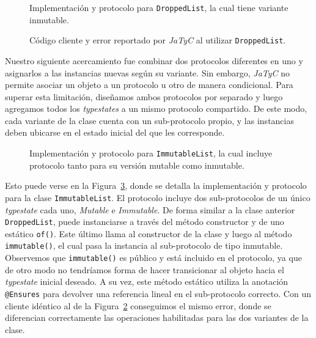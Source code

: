 \begin{figure}[htbp]
    \centering
    
    \vspace{0.3cm}
    
    \caption{Implementación y protocolo para \texttt{DroppedList}, la cual tiene variante inmutable.}
    \label{exp:dropped-list}
\end{figure}

\begin{figure}[htbp]
    \centering
    
    \vspace{0.3cm}
    
    \caption{Código cliente y error reportado por \textit{JaTyC} al utilizar \texttt{DroppedList}.}
    \label{exp:dropped-list:client}
\end{figure}

Nuestro siguiente acercamiento fue combinar dos protocolos diferentes en uno y asignarlos a las instancias nuevas según su variante. Sin embargo, \textit{JaTyC} no permite asociar un objeto a un protocolo u otro de manera condicional. Para superar esta limitación, diseñamos ambos protocolos por separado y luego agregamos todos los \textit{typestates} a un mismo protocolo compartido. De este modo, cada variante de la clase cuenta con un sub-protocolo propio, y las instancias deben ubicarse en el estado inicial del que les corresponde.

\begin{figure}[htbp]
    \centering
    
    \vspace{0.3cm}
    
    \caption{Implementación y protocolo para \texttt{ImmutableList}, la cual incluye protocolo tanto para su versión mutable como inmutable.}
    \label{exp:immutable-list}
\end{figure}

Esto puede verse en la Figura~\ref{exp:immutable-list}, donde se detalla la implementación y protocolo para la clase \texttt{ImmutableList}. El protocolo incluye dos sub-protocolos de un único \textit{typestate} cada uno, \textit{Mutable} e \textit{Immutable}. De forma similar a la clase anterior \texttt{DroppedList}, puede instanciarse a través del método constructor y de uno estático \texttt{of()}. Este último llama al constructor de la clase y luego al método \texttt{immutable()}, el cual pasa la instancia al sub-protocolo de tipo inmutable. Observemos que \texttt{immutable()} es público y está incluido en el protocolo, ya que de otro modo no tendríamos forma de hacer transicionar al objeto hacia el \textit{typestate} inicial deseado. A su vez, este método estático utiliza la anotación \texttt{@Ensures} para devolver una referencia lineal en el sub-protocolo correcto. Con un cliente idéntico al de la Figura~\ref{exp:dropped-list:client} conseguimos el mismo error, donde se diferencian correctamente las operaciones habilitadas para las dos variantes de la clase.

